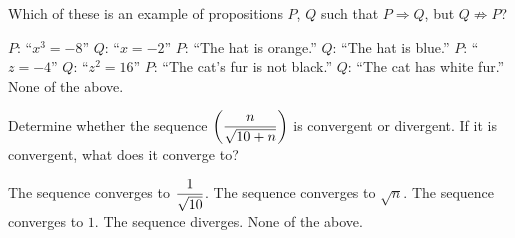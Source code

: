 \documentclass[12pt]{exam}
\newcommand{\ds}{\ensuremath{\displaystyle}}
\begin{document}
\begin{center}
\end{center}
\vspace{0.1in}

\begin{questions}

\setcounter{question}{0}
\question[10]
Which of these is an example of propositions $P$, $Q$ such that $P\Rightarrow Q$,
but $Q\not\Rightarrow P$?

\begin{checkboxes}
\choice $P$: ``$x^3 = -8$''\hspace{2em} $Q$: ``$x = -2$''
\choice $P$: ``The hat is orange.''\hspace{2em} $Q$: ``The hat is blue.''
\CorrectChoice $P$: ``$z = -4$''\hspace{2em} $Q$: ``$z^2 = 16$''
\choice $P$: ``The cat's fur is not black.''\hspace{2em} $Q$: ``The cat has white fur.''
\choice None of the above.
\end{checkboxes}

\vfill

\question[10]
Determine whether the sequence $\ds \left( \frac{n}{\sqrt{10+n}} \right)$ is convergent or divergent.  If it is convergent, what does it converge to?

\begin{checkboxes}
\choice The sequence converges to $\ds\frac{1}{\sqrt{10}}$.
\choice The sequence converges to $\sqrt{n}$.
\choice The sequence converges to $1$.
\CorrectChoice The sequence diverges.
\choice None of the above.
\end{checkboxes}

\vfill

\end{questions}
\end{document}
